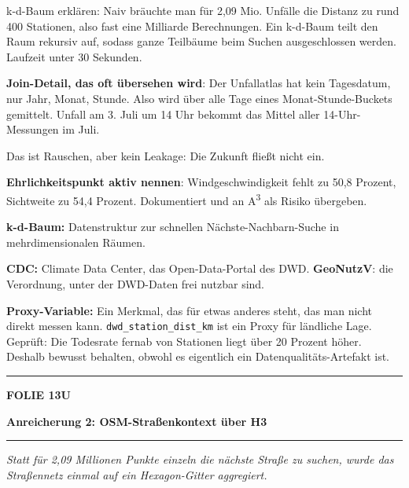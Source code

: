\documentclass[9pt]{extarticle}
\newcommand{\karte}[3]{%
  \clearpage
  {\color{Accent}\rule{\linewidth}{2.4pt}}\par\vspace{2.5pt}
  {\fontsize{8}{9}\selectfont\bfseries\color{Accent}%
   FOLIE #1\hspace{1.2em}\textbar\hspace{1.2em}#2}\par\vspace{1pt}
  {\fontsize{16}{18}\selectfont\bfseries\color{AccentDark}#3}\par\vspace{3pt}
  {\color{Accent!45}\rule{\linewidth}{0.5pt}}\par\vspace{4pt}%
}
\newcommand{\rubrik}[1]{%
  \vspace{3.5pt}{\fontsize{7.5}{8.5}\selectfont\bfseries\color{Grau}%
  \MakeUppercase{#1}}\par\vspace{1.5pt}}
\newcommand{\kernsatz}[1]{%
  \begin{tcolorbox}[enhanced,sharp corners,boxrule=0pt,
    leftrule=2.2pt,colframe=Accent,colback=AccentPale,
    left=5pt,right=5pt,top=3.5pt,bottom=3.5pt,before skip=1pt,after skip=2pt]
    \color{AccentDark}\itshape #1
  \end{tcolorbox}}
\newcommand{\bg}[2]{\item \textbf{#1:} #2}
\begin{document}
\rubrik{Sagen}
\begin{sag}
  \item k-d-Baum erklären: Naiv bräuchte man für 2,09 Mio. Unfälle die Distanz zu rund
        400 Stationen, also fast eine Milliarde Berechnungen. Ein k-d-Baum teilt den Raum
        rekursiv auf, sodass ganze Teilbäume beim Suchen ausgeschlossen werden. Laufzeit
        unter 30 Sekunden.
  \item \textbf{Join-Detail, das oft übersehen wird}: Der Unfallatlas hat kein Tagesdatum,
        nur Jahr, Monat, Stunde. Also wird über alle Tage eines Monat-Stunde-Buckets gemittelt.
        Unfall am 3. Juli um 14 Uhr bekommt das Mittel aller 14-Uhr-Messungen im Juli.
  \item Das ist Rauschen, aber kein Leakage: Die Zukunft fließt nicht ein.
  \item \textbf{Ehrlichkeitspunkt aktiv nennen}: Windgeschwindigkeit fehlt zu 50,8 Prozent,
        Sichtweite zu 54,4 Prozent. Dokumentiert und an A\textsuperscript{3} als Risiko übergeben.
\end{sag}

\rubrik{Begriffe}
\begin{begriff}
  \bg{k-d-Baum}{Datenstruktur zur schnellen Nächste-Nachbarn-Suche in mehrdimensionalen Räumen.}
  \bg{CDC}{Climate Data Center, das Open-Data-Portal des DWD. \textbf{GeoNutzV}: die Verordnung,
      unter der DWD-Daten frei nutzbar sind.}
  \bg{Proxy-Variable}{Ein Merkmal, das für etwas anderes steht, das man nicht direkt messen kann.
      \texttt{dwd\_station\_dist\_km} ist ein Proxy für ländliche Lage. Geprüft: Die Todesrate
      fernab von Stationen liegt über 20 Prozent höher. Deshalb bewusst behalten, obwohl es
      eigentlich ein Datenqualitäts-Artefakt ist.}
\end{begriff}

\karte{13}{U}{Anreicherung 2: OSM-Straßenkontext über H3}

\kernsatz{Statt für 2,09 Millionen Punkte einzeln die nächste Straße zu suchen, wurde das
Straßennetz einmal auf ein Hexagon-Gitter aggregiert.}
\end{document}
